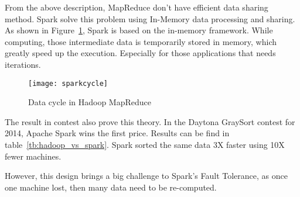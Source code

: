 \clearpage
From the above description, MapReduce don’t have efficient data sharing method. Spark solve this problem using In-Memory data processing and sharing\cite{apache_spark}. As shown in Figure~\ref{fg:spark}, Spark is based on the in-memory framework. While computing, those intermediate data is temporarily stored in memory, which greatly speed up the execution. Especially for those applications that needs iterations.

\begin{figure}[h]
	\centering
	\texttt{[image: sparkcycle]}
	\caption{Data cycle in Hadoop MapReduce}
	\label{fg:spark}
\end{figure}


The result in contest also prove this theory. In the Daytona GraySort contest for 2014, Apache Spark wins the first price\cite{3_xin_2014}. Results can be find in table~\ref{tb:hadoop_vs_spark}. Spark sorted the same data 3X faster using 10X fewer machines.
\begin{table}[h]
	\centering
	\caption{Spark TeraSort vs MapReduce\cite{3_xin_2014}}
	\label{tb:hadoop_vs_spark}
\end{table}

However, this design brings a big challenge to Spark’s Fault Tolerance, as once one machine lost, then many data need to be re-computed.

